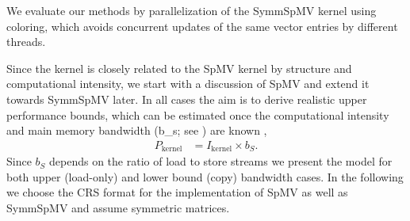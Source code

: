 We evaluate our methods by parallelization of the \acrshort{SymmSpMV}
kernel using \DTWO coloring, which avoids concurrent updates of the
same vector entries by different threads.


Since the kernel is closely related to the \acrfull{SpMV} kernel by
structure and computational intensity, we start with a discussion
of \acrshort{SpMV} and extend it towards \acrshort{SymmSpMV} later. In
all cases the aim is to derive realistic upper performance bounds,
which can be estimated once the computational intensity and main
memory bandwidth (\acrshort{b_s}; see ) are
known \cite{Williams_roofline}, \ie
\begin{align}
   	\label{eq:upper_performance}
   	P_\mathrm{kernel}  &= I_\mathrm{kernel}  \times b_S.
  \end{align}
Since $b_S$ depends on the ratio of load to store streams we present
the model for both upper (load-only) and lower bound (copy) bandwidth
cases.
In the following we choose the \acrfull{CRS} format for the
implementation of \acrshort{SpMV} as well as \acrshort{SymmSpMV} and
assume symmetric matrices.  

